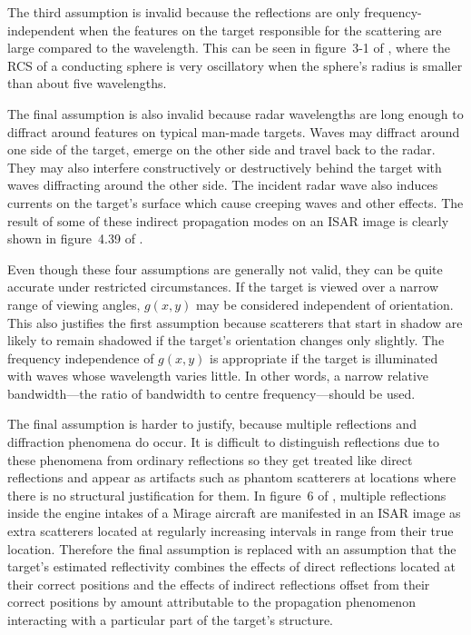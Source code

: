 The third assumption is invalid because the reflections are only
frequency-independent when the features on the target responsible for the
scattering are large compared to the wavelength.  This can be seen in
figure~3-1 of \cite{Bla86}, where the RCS of a conducting sphere is very
oscillatory when the sphere's radius is smaller than about five wavelengths.

The final assumption is also invalid because radar wavelengths are long
enough to diffract around features on typical man-made targets.  Waves may
diffract around one side of the target, emerge on the other side and
travel back to the radar.  They may also interfere constructively or
destructively behind the target with
waves diffracting around the other side.  The incident radar wave also
induces currents on the target's surface which cause creeping waves and
other effects.  The result of some of these indirect propagation modes on an
ISAR image is clearly shown in figure~4.39 of \cite{Men91}.

Even though these four assumptions are generally not valid, they can be
quite accurate under restricted circumstances.  If the target is viewed over
a narrow range of viewing angles, $g(x,y)$ may be considered independent of
orientation.  This also justifies the first assumption because scatterers
that start in shadow are likely to remain shadowed if the target's
orientation changes only slightly.  The frequency independence of $g(x,y)$
is appropriate if the target is illuminated with waves whose wavelength
varies little.  In other words, a narrow relative bandwidth---the ratio of
bandwidth to centre frequency---should be used.  

The final assumption is harder to justify, because multiple reflections and
diffraction phenomena do occur.  It is difficult to distinguish reflections
due to these phenomena from ordinary reflections so they get treated like
direct reflections and appear as artifacts such as phantom scatterers at
locations where there is no structural justification for them.  In figure~6
of \cite{Zyw94}, multiple reflections inside the engine intakes of a Mirage 
aircraft are manifested in an ISAR image as extra scatterers located at
regularly increasing intervals in range from their true location.  Therefore
the final assumption is replaced with an assumption that the target's
estimated reflectivity combines the effects of direct reflections located at
their correct positions and the effects of indirect reflections offset from
their correct positions by amount attributable to the propagation phenomenon
interacting with a particular part of the target's structure.


